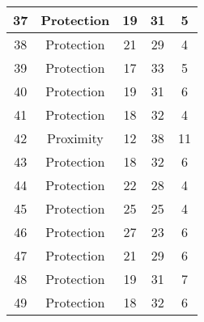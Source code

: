 \documentclass[results.tex]{subfiles}
\begin{document}
\begin{center}
\begin{tabular}{| c || c | c | c | c |}
            \hline
            37                      & Protection                   & 19                     & 31                      & 5                    \\
            \hline
            38                      & Protection                   & 21                     & 29                      & 4                    \\
            \hline
            39                      & Protection                   & 17                     & 33                      & 5                    \\
            \hline
            40                      & Protection                   & 19                     & 31                      & 6                    \\
            \hline
            41                      & Protection                   & 18                     & 32                      & 4                    \\
            \hline
            42                      & Proximity                    & 12                     & 38                      & 11                   \\
            \hline
            43                      & Protection                   & 18                     & 32                      & 6                    \\
            \hline
            44                      & Protection                   & 22                     & 28                      & 4                    \\
            \hline
            45                      & Protection                   & 25                     & 25                      & 4                    \\
            \hline
            46                      & Protection                   & 27                     & 23                      & 6                    \\
            \hline
            47                      & Protection                   & 21                     & 29                      & 6                    \\
            \hline
            48                      & Protection                   & 19                     & 31                      & 7                    \\
            \hline
            49                      & Protection                   & 18                     & 32                      & 6                    \\
            \hline
        \end{tabular}
    \end{center}
\end{document}
